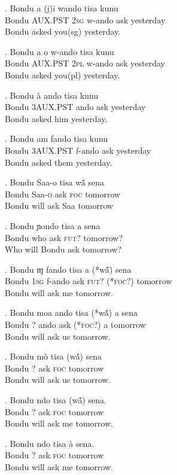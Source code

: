 \documentclass{assets/fieldnotes}
\begin{document}
\exg. Bondu a (j)i wando tisa kunu\\
Bondu \textsc{AUX.PST} 2\textsc{sg} w-ando ask yesterday\\
Bondu asked you(sg) yesterday.

\exg.  Bondu a o w-ando tisa kunu\\
Bondu \textsc{AUX.PST} 2\textsc{pl} w-ando ask yesterday\\
Bondu asked you(pl) yesterday.

\exg. Bondu à ando tisa kunu\\
Bondu 3\textsc{AUX.PST} ando ask yesterday\\
Bondu asked him yesterday.

\exg. Bondu am fando tisa kunu\\
Bondu 3\textsc{AUX.PST} f-ando ask yesterday\\
Bondu asked them yesterday. 


\exg. Bondu Saa-o tisa wã́ sena\\
Bondu Saa-\textsc{o} ask \textsc{foc} tomorrow\\
Bondu will ask Saa tomorrow

\exg. Bondu ɲondo tisa a sena\\
Bondu who ask \textsc{fut?} tomorrow?\\
Who will Bondu ask tomorrow?

\exg. Bondu ɱ fando tisa a (*wã́) sena\\
Bondu 1\textsc{sg} f-ando ask \textsc{fut?} (*\textsc{foc?})  tomorrow\\
Bondu will ask me tomorrow.

\exg. Bondu moa ando tisa (*wã́) a sena\\
Bondu ? ando ask (*\textsc{foc?}) a tomorrow\\
Bondu will ask us tomorrow.

\exg. Bondu mò tisa (wã́) sena\\
Bondu ? ask \textsc{foc} tomorrow\\
Bondu will ask us tomorrow.

\exg. Bondu ndo tisa (wã́)  sena.\\
Bondu ? ask \textsc{foc} tomorrow\\
Bondu will ask me tomorrow.

\exg. Bondu ndo tisa à sena.\\
Bondu ? ask \textsc{foc} tomorrow\\
Bondu will ask me tomorrow.
\end{document}
